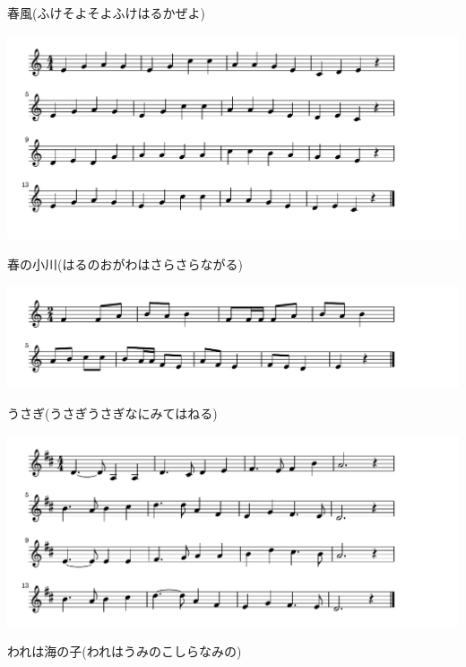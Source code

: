 \documentclass[a4paper]{ltjsarticle}
\begin{document}
\vspace{-10mm} \hspace{10mm}
春風(ふけそよそよふけはるかぜよ)

\includegraphics[clip]{harunoogawa_crop.pdf}

\vspace{-10mm} \hspace{10mm}
春の小川(はるのおがわはさらさらながる)


\includegraphics[clip]{usagi_crop.pdf}

\vspace{-10mm} \hspace{10mm}
うさぎ(うさぎうさぎなにみてはねる)

\includegraphics[clip]{warewaumi_crop.pdf}

\vspace{-10mm} \hspace{10mm}
われは海の子(われはうみのこしらなみの)
\end{document}
